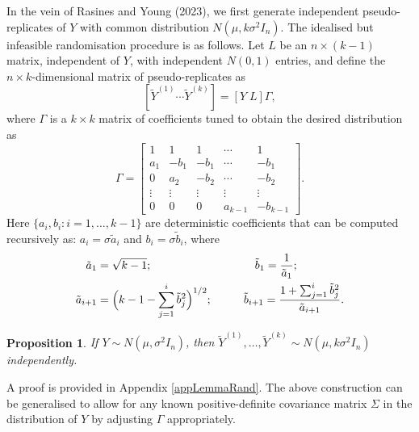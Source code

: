 \documentclass[10pt, reqno]{amsart}
\newtheorem{proposition}{Proposition}[section]
\numberwithin{equation}{section}
\begin{document}
In the vein of Rasines and Young (2023), we first generate independent pseudo-replicates of $Y$ with common distribution $N(\mu, k\sigma^2 I_n)$. The idealised but infeasible randomisation procedure is as follows. Let $L$ be an $n\times (k-1)$ matrix, independent of $Y$, with independent $N(0, 1)$ entries, and define the $n\times k$-dimensional matrix of pseudo-replicates as
\begin{equation} \label{EQ: randomisation}
	[\tilde{Y}^{(1)} \cdots \tilde{Y}^{(k)}] = [Y \; L] \Gamma, 
\end{equation}
where $\Gamma$ is a $k\times k$ matrix of coefficients tuned to obtain the desired distribution as
\begin{equation}
	\Gamma = \begin{bmatrix}
		1 & 1 & 1 & \cdots & 1 \\
		a_1 & -b_1 & -b_1 &  \cdots & -b_1 \\
		0 & a_2 & -b_2 &  \cdots & -b_2 \\
		\vdots & \vdots & \vdots & \vdots & \vdots \\
		0 & 0 & 0 & a_{k-1} & -b_{k-1}
	\end{bmatrix}.
\end{equation}
Here $\{a_i, b_i\colon i = 1, \ldots, k-1\}$ are deterministic coefficients that can be computed recursively as: $a_i = \sigma\tilde a_i$ and $b_i = \sigma\tilde b_i$, where
%
\begin{align}
	\begin{split}\label{eqRecursive}
		\tilde a_1 =& \; \sqrt{k-1}; \hspace{3.2cm} \tilde b_1 = \frac{1}{\tilde a_1}; \\
		\tilde a_{i+1} =& \; \Bigl(k - 1 -  \sum_{j = 1}^{i} \tilde b_j^2\Bigr)^{1/2}; \hspace{0.98cm}
		\tilde b_{i+1} = \frac{1 + \sum_{j = 1}^{i} \tilde b_j^2}{\tilde a_{i+1}}.
	\end{split}
\end{align}
%
\begin{proposition}
	\label{lemmaRand}
	If $Y\sim N(\mu, \sigma^2 I_n)$, then $\tilde{Y}^{(1)}, \ldots, \tilde{Y}^{(k)}\sim N(\mu, k \sigma^2 I_n)$ independently.    
\end{proposition}
%
A proof is provided in Appendix \ref{appLemmaRand}. The above construction can be generalised to allow for any known positive-definite covariance matrix $\Sigma$ in the distribution of $Y$ by adjusting $\Gamma$ appropriately. 
\end{document}

